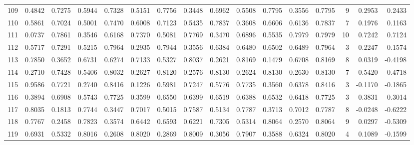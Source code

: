 \begin{tabular}{lrrrrrrrrrrrrrrr}
109 &      0.4842 &  0.7275 &  0.5944 &  0.7328 &  0.5151 &  0.7756 &  0.3448 &  0.6962 &  0.5508 &  0.7795 &   0.3556 &     0.7795 &      9 &                    0.2953 &                     0.2433 \\
110 &      0.5861 &  0.7024 &  0.5001 &  0.7470 &  0.6008 &  0.7123 &  0.5435 &  0.7837 &  0.3608 &  0.6606 &   0.6136 &     0.7837 &      7 &                    0.1976 &                     0.1163 \\
111 &      0.0737 &  0.7861 &  0.3546 &  0.6168 &  0.7370 &  0.5081 &  0.7769 &  0.3470 &  0.6896 &  0.5535 &   0.7979 &     0.7979 &     10 &                    0.7242 &                     0.7124 \\
112 &      0.5717 &  0.7291 &  0.5215 &  0.7964 &  0.2935 &  0.7944 &  0.3556 &  0.6384 &  0.6480 &  0.6502 &   0.6489 &     0.7964 &      3 &                    0.2247 &                     0.1574 \\
113 &      0.7850 &  0.3652 &  0.6731 &  0.6274 &  0.7133 &  0.5327 &  0.8037 &  0.2621 &  0.8169 &  0.1479 &   0.6708 &     0.8169 &      8 &                    0.0319 &                    -0.4198 \\
114 &      0.2710 &  0.7428 &  0.5406 &  0.8032 &  0.2627 &  0.8120 &  0.2576 &  0.8130 &  0.2624 &  0.8130 &   0.2630 &     0.8130 &      7 &                    0.5420 &                     0.4718 \\
115 &      0.9586 &  0.7721 &  0.2740 &  0.8416 &  0.1226 &  0.5981 &  0.7247 &  0.5776 &  0.7735 &  0.3560 &   0.6378 &     0.8416 &      3 &                   -0.1170 &                    -0.1865 \\
116 &      0.3894 &  0.6908 &  0.5743 &  0.7725 &  0.3599 &  0.6550 &  0.6399 &  0.6519 &  0.6388 &  0.6532 &   0.6418 &     0.7725 &      3 &                    0.3831 &                     0.3014 \\
117 &      0.8035 &  0.1813 &  0.7744 &  0.3447 &  0.7017 &  0.5015 &  0.7587 &  0.5134 &  0.7787 &  0.3713 &   0.7012 &     0.7787 &      8 &                   -0.0248 &                    -0.6222 \\
118 &      0.7767 &  0.2458 &  0.7823 &  0.3574 &  0.6442 &  0.6593 &  0.6221 &  0.7305 &  0.5314 &  0.8064 &   0.2570 &     0.8064 &      9 &                    0.0297 &                    -0.5309 \\
119 &      0.6931 &  0.5332 &  0.8016 &  0.2608 &  0.8020 &  0.2869 &  0.8009 &  0.3056 &  0.7907 &  0.3588 &   0.6324 &     0.8020 &      4 &                    0.1089 &                    -0.1599 \\

\end{tabular}
